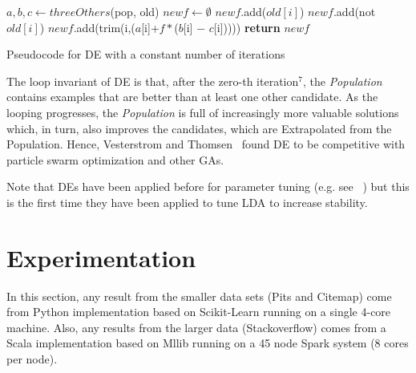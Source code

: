 \documentclass[10pt,conference]{IEEEtran}
\theoremstyle{break}
\begin{document}
\begin{algorithm}
\begin{algorithmic}[1]
        \State $a,b,c \leftarrow threeOthers$(pop, old)
        \State $newf \leftarrow \emptyset$
                \State $newf$.add($old[i]$)
            \Else
                    \State $newf$.add(not $old[i]$)
                \Else 
                    \State $newf$.add(trim(i,($a$[i]+$f\ast$($b$[i] $-$ $c$[i]))))
                \EndIf
            \EndIf
        \EndFor
        \State \textbf{return} $newf$ 
    \EndFunction
    \caption{Pseudocode for DE with a constant number of iterations}
    \end{algorithmic}
\end{algorithm}

The loop invariant of DE is that, after the zero-th iteration$^7$, the \textit{Population}
contains examples that are better than at least one other candidate.
As the looping progresses, the \textit{Population} is full of increasingly more valuable solutions
which, in turn, also improves the candidates, which are Extrapolated from the Population.
Hence, Vesterstrom and Thomsen~\cite{vesterstrom2004comparative} found DE to be
competitive with particle swarm optimization and other GAs.

Note that DEs have been
applied before for parameter tuning (e.g. see~\cite{panichella2013effectively, lohar2013improving, sun2015msr4sm,%
omran2005differential,chiha2012tuning, fu2016tuning} ) but this is the first time they have been
applied to tune LDA to increase stability.



\section{Experimentation}


In this section,
 any result from the smaller data sets (Pits and Citemap) come
from Python implementation based on Scikit-Learn running on a single 4-core machine.
Also,
  any results from the larger data (Stackoverflow) comes from a Scala implementation
  based on Mllib running on a 45 node Spark system (8 cores per node).
  
\end{document}
